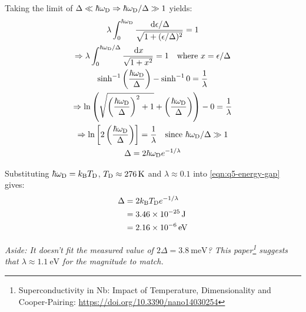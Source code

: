 \begin{parts}
\begin{subparts}
		Taking the limit of $\Delta \ll \hbar\omega_\textnormal{D} \Rightarrow \hbar\omega_\textnormal{D} / \Delta \gg 1$ yields:
		\begin{gather}
			\lambda \int_{0}^{\hbar\omega_\textnormal{D}} \frac{\,\mathrm{d}{\epsilon} / \Delta}{\sqrt{1 + (\epsilon/\Delta)^2}} = 1 \notag \\
			\Rightarrow \lambda \int_{0}^{\hbar\omega_\textnormal{D} / \Delta} \frac{\,\mathrm{d}{x}}{\sqrt{1+x^2}} = 1 \textnormal{\hspace{1em}where $x=\epsilon/\Delta$} \notag \\
			\sinh^{-1} \left(\frac{\hbar\omega_\textnormal{D}}{\Delta}\right) - \sinh^{-1} 0 = \frac{1}{\lambda} \notag \\
			\Rightarrow \ln \left(\sqrt{\left(\frac{\hbar\omega_\textnormal{D}}{\Delta}\right)^2 + 1} + \left(\frac{\hbar\omega_\textnormal{D}}{\Delta}\right)\right) - 0 = \frac{1}{\lambda} \notag \\
			\Rightarrow \ln \left[ 2 \left(\frac{\hbar\omega_\textnormal{D}}{\Delta}\right) \right] = \frac{1}{\lambda} \textnormal{\hspace{1em}since $\hbar\omega_\textnormal{D} / \Delta \gg 1$} \notag \\
			\Delta = 2\hbar\omega_\textnormal{D} e^{-1/\lambda}
			\label{eqn:q5-energy-gap}
		\end{gather}
		
		\subpart Substituting $\hbar\omega_\textnormal{D} = k_\textnormal{B}T_\textnormal{D}$, $T_\textnormal{D} \approx \SI{276}{\kelvin}$ and $\lambda \approx 0.1$ into \eqref{eqn:q5-energy-gap} gives:
		\begin{align*}
			\Delta &= 2k_\textnormal{B}T_\textnormal{D} e^{-1/\lambda} \\
			&= \SI{3.46e-25}{\joule} \\
			&= \SI{2.16e-6}{\electronvolt}
		\end{align*}
		
		\textit{Aside: It doesn't fit the measured value of $2\Delta = \SI{3.8}{\milli\electronvolt}$? This paper\footnote{Superconductivity in Nb: Impact of Temperature, Dimensionality and Cooper-Pairing: \url{https://doi.org/10.3390/nano14030254}} suggests that $\lambda \approx \SI{1.1}{\electronvolt}$ for the magnitude to match.}
	\end{subparts}
\end{parts}